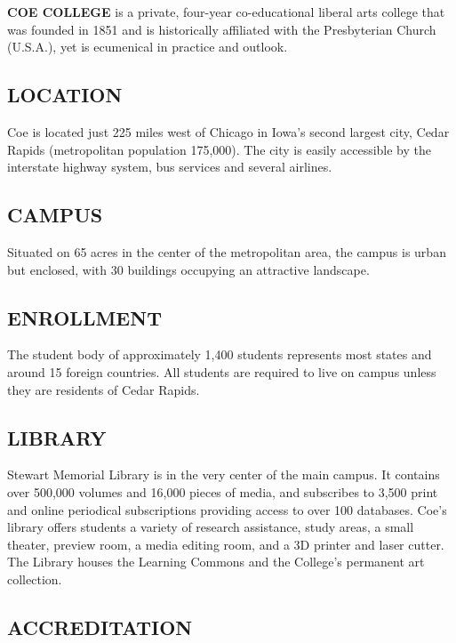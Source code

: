 \documentclass[
  letterpaper,
]{scrbook}
\begin{document}
\textbf{COE COLLEGE} is a private, four-year co-educational liberal arts
college that was founded in 1851 and is historically affiliated with the
Presbyterian Church (U.S.A.), yet is ecumenical in practice and outlook.

\hypertarget{location}{%
\subsection{LOCATION}\label{location}}

Coe is located just 225 miles west of Chicago in Iowa's second largest
city, Cedar Rapids (metropolitan population 175,000). The city is easily
accessible by the interstate highway system, bus services and several
airlines.

\hypertarget{campus}{%
\subsection{CAMPUS}\label{campus}}

Situated on 65 acres in the center of the metropolitan area, the campus
is urban but enclosed, with 30 buildings occupying an attractive
landscape.

\hypertarget{enrollment}{%
\subsection{ENROLLMENT}\label{enrollment}}

The student body of approximately 1,400 students represents most states
and around 15 foreign countries. All students are required to live on
campus unless they are residents of Cedar Rapids.

\hypertarget{library}{%
\subsection{LIBRARY}\label{library}}

Stewart Memorial Library is in the very center of the main campus. It
contains over 500,000 volumes and 16,000 pieces of media, and subscribes
to 3,500 print and online periodical subscriptions providing access to
over 100 databases. Coe's library offers students a variety of research
assistance, study areas, a small theater, preview room, a media editing
room, and a 3D printer and laser cutter. The Library houses the Learning
Commons and the College's permanent art collection.

\hypertarget{accreditation}{%
\subsection{ACCREDITATION}\label{accreditation}}
\end{document}
